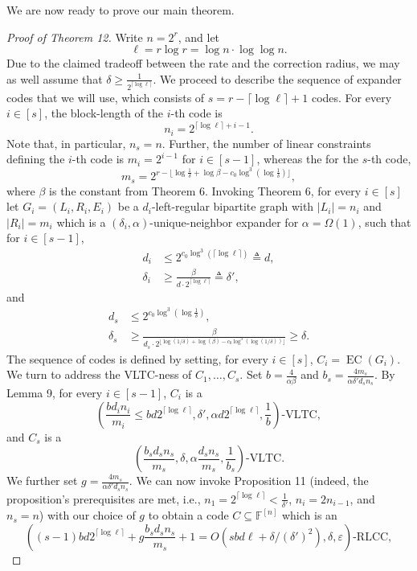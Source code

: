 \documentclass[10pt,a4paper]{article}
\begin{document}
We are now ready to prove our main theorem.
\begin{proof}[Proof of Theorem 12]
Write $n=2^r$, and let
\[\ell=r\log r=\log n\cdot\log\log n.\]
Due to the claimed tradeoff between the rate and the correction radius, we may as well assume that $\delta\ge\frac1{2^{\lceil\log\ell\rceil}}$. We proceed to describe the sequence of expander codes that we will use, which consists of $s=r-\lceil\log\ell\rceil+1$ codes. For every $i\in[s]$, the block-length of the $i$-th code is
\[n_i=2^{\lceil\log\ell\rceil+i-1}.\]
Note that, in particular, $n_s=n$. Further, the number of linear constraints defining the $i$-th code is $m_i=2^{i-1}$ for $i\in[s-1]$, whereas the for the $s$-th code,
\[m_s=2^{r-\lfloor\log\frac1\delta+\log\beta-c_0\log^3(\log\frac1\delta)\rfloor},\]
where $\beta$ is the constant from Theorem 6.
Invoking Theorem 6, for every $i\in[s]$ let $G_i=(L_i,R_i,E_i)$ be a $d_i$-left-regular bipartite graph with $|L_i|=n_i$ and $|R_i|=m_i$ which is a $(\delta_i,\alpha)$-unique-neighbor expander for $\alpha=\Omega(1)$, such that for $i\in[s-1]$,
\begin{align*}d_i&\le2^{c_0\log^3(\lceil\log\ell\rceil)}\triangleq d,\\\delta_i&\ge\frac\beta{d\cdot2^{\lceil\log\ell\rceil}}\triangleq\delta',\end{align*}
and
\begin{align*}d_s&\le2^{c_0\log^3(\log\frac1\delta)},\\\delta_s&\ge\frac\beta{d_s\cdot2^{\lfloor\log(1/\delta)+\log(\beta)-c_0\log^3(\log(1/\delta))\rfloor}}\ge\delta.\end{align*}
The sequence of codes is defined by setting, for every $i\in[s]$, $C_i=\operatorname{EC}(G_i)$.
We turn to address the VLTC-ness of $C_1,\ldots,C_s$. Set $b=\frac4{\alpha\beta}$ and $b_s=\frac{4m_s}{\alpha\delta'd_s n_s}$. By Lemma 9, for every $i\in[s-1]$, $C_i$ is a
\[\left(\frac{bd_i n_i}{m_i}\le bd2^{\lceil\log\ell\rceil},\delta',\alpha d2^{\lceil\log\ell\rceil},\frac1b\right)\text{-VLTC},\]
and $C_s$ is a
\[\left(\frac{b_s d_s n_s}{m_s},\delta,\alpha\frac{d_s n_s}{m_s},\frac1{b_s}\right)\text{-VLTC}.\]
We further set $g=\frac{4m_s}{\alpha\delta'd_s n_s}$. We can now invoke Proposition 11 (indeed, the proposition's prerequisites are met, i.e., $n_1=2^{\lceil\log\ell\rceil}<\frac1{\delta'}$, $n_i=2n_{i-1}$, and $n_s=n$) with our choice of $g$ to obtain a code $C\subseteq\mathbb F^{[n]}$ which is an
\[\left((s-1)bd2^{\lceil\log\ell\rceil}+g\frac{b_s d_s n_s}{m_s}+1=O(sbd\ell+\delta/(\delta')^2),\delta,\varepsilon\right)\text{-RLCC},\]

\end{proof}
\end{document}
